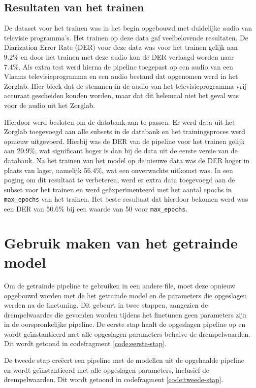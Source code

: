 \subsection{Resultaten van het trainen}
\label{subsec:train-res}

De dataset voor het trainen was in het begin opgebouwd met duidelijke audio van televisie programma's. Het trainen op deze data gaf veelbelovende resultaten. De Diarization Error Rate (DER) voor deze data was voor het trainen gelijk aan 9.2\% en door het trainen met deze audio kon de DER verlaagd worden naar 7.4\%. Als extra test werd hierna de pipeline toegepast op een audio van een Vlaams televisieprogramma en een audio bestand dat opgenomen werd in het Zorglab. Hier bleek dat de stemmen in de audio van het televisieprogramma vrij accuraat gescheiden konden worden, maar dat dit helemaal niet het geval was voor de audio uit het Zorglab.

Hierdoor werd besloten om de databank aan te passen. Er werd data uit het Zorglab toegevoegd aan alle subsets in de databank en het trainingsproces werd opnieuw uitgevoerd. Hierbij was de DER van de pipeline voor het trainen gelijk aan 20.9\%, wat significant hoger is dan bij de data uit de eerste versie van de databank. Na het trainen van het model op de nieuwe data was de DER hoger in plaats van lager, namelijk 56.4\%, wat een onverwachte uitkomst was. In een poging om dit resultaat te verbeteren, werd er extra data toegevoegd aan de subset voor het trainen en werd geëxperimenteerd met het aantal epochs in \lstinline{max_epochs} van het trainen. Het beste resultaat dat hierdoor bekomen werd was een DER van 50.6\% bij een waarde van 50 voor \lstinline{max_epochs}.

\section{Gebruik maken van het getrainde model}
\label{sec:gebruik}
Om de getrainde pipeline te gebruiken in een andere file, moet deze opnieuw opgebouwd worden met de het getrainde model en de parameters die opgeslagen werden na de finetuning. Dit gebeurt in twee stappen, aangezien de drempelwaardes die gevonden worden tijdens het finetunen geen parameters zijn in de oorspronkelijke pipeline. De eerste stap haalt de opgeslagen pipeline op en wordt geïnstantieerd met alle opgeslagen parameters behalve de drempelwaarden. Dit wordt getoond in codefragment \ref{code:eerste-stap}.

De tweede stap creëert een pipeline met de modellen uit de opgehaalde pipeline en wordt geïnstantieerd met alle opgeslagen parameters, inclusief de drempelwaarden. Dit wordt getoond in codefragment \ref{code:tweede-stap}.

